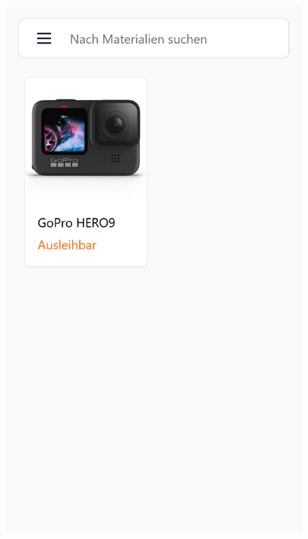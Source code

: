 \begin{figure}[p]
    \centering
    \includegraphics[scale=0.17]{Bilder/Dialgobeispiel/Suche.png}\hspace{1em}

\end{figure}
